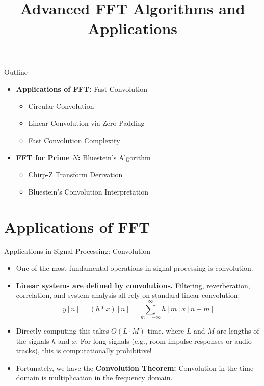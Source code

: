 

\title{Advanced FFT Algorithms and Applications}



\maketitle

\begin{frame}{Outline}
    \begin{itemize}
        \item \textbf{Applications of FFT:} Fast Convolution
              \begin{itemize}
                  \item Circular Convolution
                  \item Linear Convolution via Zero-Padding
                  \item Fast Convolution Complexity
              \end{itemize}
        \item \textbf{FFT for Prime $N$:} Bluestein's Algorithm
              \begin{itemize}
                  \item Chirp-Z Transform Derivation
                  \item Bluestein's Convolution Interpretation
              \end{itemize}
    \end{itemize}
\end{frame}


\section{Applications of FFT}

\begin{frame}{Applications in Signal Processing: Convolution}
    \begin{itemize}
        \item One of the most fundamental operations in signal processing is convolution.
        \item \textbf{Linear systems are defined by convolutions.} Filtering, reverberation, correlation, and system analysis all rely on standard linear convolution:
              \begin{equation*}
                  y[n] = (h * x)[n] = \sum_{m=-\infty}^{\infty} h[m] x[n-m]
              \end{equation*}
        \item Directly computing this takes $O(L \cdot M)$ time, where $L$ and $M$ are lengths of the signals $h$ and $x$. For long signals (e.g., room impulse responses or audio tracks), this is computationally prohibitive!
        \item Fortunately, we have the \textbf{Convolution Theorem:} Convolution in the time domain is multiplication in the frequency domain.
    \end{itemize}
\end{frame}

